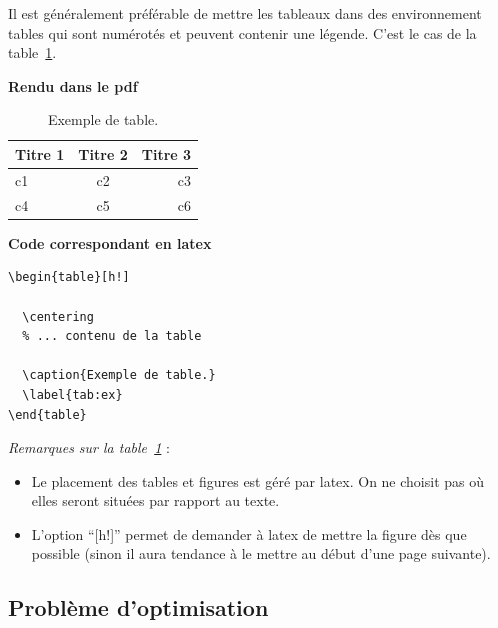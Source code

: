 \documentclass[12pt]{report}
\begin{document}
Il  est  généralement  préférable  de mettre  les  tableaux  dans  des
environnement  tables  qui  sont  numérotés et  peuvent  contenir  une
légende. C'est le cas de la table~\ref{tab:ex}.


\begin{table}[h!]
\begin{minipage}[t]{.45\linewidth}
\textbf{Rendu dans le pdf}
\vspace{.5cm}

  \centering

  \begin{tabular}{lcr}
    \hline
    \textbf{Titre 1} 
    & \textbf{Titre 2} 
    & \textbf{Titre 3} \\

    \hline
    c1 & c2 & c3 \\

    c4 & c5 & c6\\

    \hline
  \end{tabular}
\end{minipage}\hfill\vrule\hfill
\begin{minipage}[t]{.45\linewidth}
\textbf{Code correspondant en latex}

\begin{verbatim}
\begin{table}[h!]

  \centering
  % ... contenu de la table

  \caption{Exemple de table.}
  \label{tab:ex}
\end{table}
\end{verbatim}
\end{minipage}

  \caption{Exemple de table.}
  \label{tab:ex}
\end{table}

\textit{Remarques sur la table~\ref{tab:ex}} :
\begin{itemize}
 \item Le placement des tables et figures est géré par latex.  On
  ne choisit pas où elles seront situées par rapport au texte.
\item L'option ``[h!]'' permet de demander à latex de mettre la figure
  dès que possible (sinon il aura  tendance à le mettre au début d'une
  page suivante).
\end{itemize}


\subsection{Problème d'optimisation}
\end{document}
